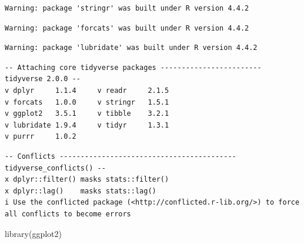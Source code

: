 \documentclass[
  letterpaper,
  DIV=11,
  numbers=noendperiod]{scrartcl}
\newenvironment{Shaded}{\begin{snugshade}}{\end{snugshade}}
\newcommand{\FunctionTok}[1]{\textcolor[rgb]{0.28,0.35,0.67}{#1}}
\newcommand{\NormalTok}[1]{\textcolor[rgb]{0.00,0.23,0.31}{#1}}
\begin{document}
\begin{verbatim}
Warning: package 'stringr' was built under R version 4.4.2
\end{verbatim}

\begin{verbatim}
Warning: package 'forcats' was built under R version 4.4.2
\end{verbatim}

\begin{verbatim}
Warning: package 'lubridate' was built under R version 4.4.2
\end{verbatim}

\begin{verbatim}
-- Attaching core tidyverse packages ------------------------ tidyverse 2.0.0 --
v dplyr     1.1.4     v readr     2.1.5
v forcats   1.0.0     v stringr   1.5.1
v ggplot2   3.5.1     v tibble    3.2.1
v lubridate 1.9.4     v tidyr     1.3.1
v purrr     1.0.2     
\end{verbatim}

\begin{verbatim}
-- Conflicts ------------------------------------------ tidyverse_conflicts() --
x dplyr::filter() masks stats::filter()
x dplyr::lag()    masks stats::lag()
i Use the conflicted package (<http://conflicted.r-lib.org/>) to force all conflicts to become errors
\end{verbatim}

\begin{Shaded}
\begin{Highlighting}[]
\FunctionTok{library}\NormalTok{(ggplot2)}
\end{Highlighting}
\end{Shaded}
\end{document}
